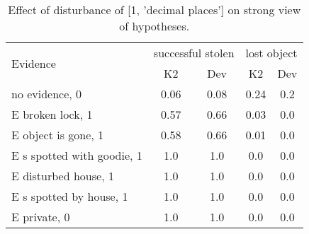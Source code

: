 \begin{table}\begin{tabular}{l|cc|cc}\toprule\multirow{2}{*}{Evidence} & \multicolumn{2}{c}{successful stolen}& \multicolumn{2}{c}{lost object}\\& {K2} & {Dev}& {K2} & {Dev}\\\midrule
no evidence, 0 & 0.06&0.08&0.24&0.2\\E broken lock, 1 & \cellcolor{Bittersweet}0.57&\cellcolor{Bittersweet}0.66&0.03&0.0\\E object is gone, 1 & \cellcolor{Bittersweet}0.58&\cellcolor{Bittersweet}0.66&0.01&0.0\\E s spotted with goodie, 1 & 1.0&1.0&0.0&0.0\\E disturbed house, 1 & 1.0&1.0&0.0&0.0\\E s spotted by house, 1 & 1.0&1.0&0.0&0.0\\E private, 0 & 1.0&1.0&0.0&0.0\\\bottomrule\end{tabular}\caption{Effect of disturbance of [1, 'decimal places'] on strong view of hypotheses.}\end{table}